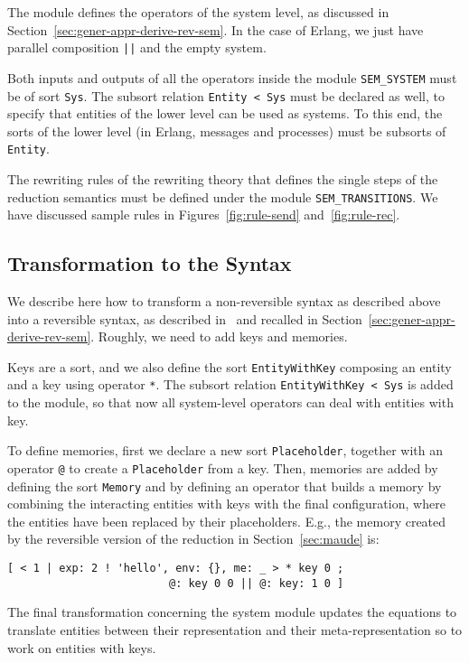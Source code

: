 \documentclass{article}[12pt,a4paper]
\theoremstyle{definition}
\begin{document}
The module defines the operators of the system level, as discussed in Section~\ref{sec:gener-appr-derive-rev-sem}. In the case of Erlang, we just have parallel composition \verb+||+ and the empty system.

Both inputs and outputs of all the operators inside the module \verb+SEM_SYSTEM+ must be of sort
\verb+Sys+. The subsort
relation \verb+Entity < Sys+ must be declared as well, to specify that
entities of the lower level can be used as systems.
To this end, the sorts of the lower level (in Erlang, messages and processes) must be subsorts of
\verb+Entity+.

The rewriting rules of the rewriting theory that defines the
single steps of the reduction semantics must be defined under the module
\verb+SEM_TRANSITIONS+. We have discussed sample rules in Figures~\ref{fig:rule-send} and~\ref{fig:rule-rec}.

\subsection{Transformation to the Syntax}
We describe here how to transform a non-reversible syntax as
described above into a reversible syntax, as described
in~\cite{LaneseM20} and recalled in
Section~\ref{sec:gener-appr-derive-rev-sem}. Roughly, we need to add
keys and memories.

Keys are a sort, and we also define the sort \verb+EntityWithKey+ composing an entity and a key using operator \verb+*+.
The subsort relation \verb+EntityWithKey < Sys+ is added to the module, so that now all system-level
operators can deal with entities with key. 

To define memories, first we declare a new sort \verb+Placeholder+,
together with an operator \verb+@+ to create a \verb+Placeholder+ from a key.
Then, memories are added by defining the sort \verb+Memory+ and by defining an
operator that builds a memory by combining the interacting entities with keys with the final configuration, where the
entities have been replaced by their placeholders. E.g., the memory created by the reversible version of the reduction in Section~\ref{sec:maude} is:

\begin{verbatim}
[ < 1 | exp: 2 ! 'hello', env: {}, me: _ > * key 0 ; 
                         @: key 0 0 || @: key: 1 0 ]
\end{verbatim}

The final transformation concerning the system module updates the
equations to translate entities between their representation and their
meta-representation so to work on entities with keys.
\end{document}
